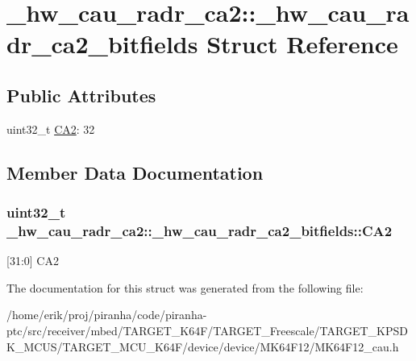 \hypertarget{struct__hw__cau__radr__ca2_1_1__hw__cau__radr__ca2__bitfields}{}\section{\+\_\+hw\+\_\+cau\+\_\+radr\+\_\+ca2\+:\+:\+\_\+hw\+\_\+cau\+\_\+radr\+\_\+ca2\+\_\+bitfields Struct Reference}
\label{struct__hw__cau__radr__ca2_1_1__hw__cau__radr__ca2__bitfields}
\subsection*{Public Attributes}
\begin{DoxyCompactItemize}
\item 
uint32\+\_\+t \hyperlink{struct__hw__cau__radr__ca2_1_1__hw__cau__radr__ca2__bitfields_a69694a3e5540507aba1a0eafe5e626ab}{C\+A2}\+: 32
\end{DoxyCompactItemize}


\subsection{Member Data Documentation}
\subsubsection[{\texorpdfstring{C\+A2}{CA2}}]{\setlength{\rightskip}{0pt plus 5cm}uint32\+\_\+t \+\_\+hw\+\_\+cau\+\_\+radr\+\_\+ca2\+::\+\_\+hw\+\_\+cau\+\_\+radr\+\_\+ca2\+\_\+bitfields\+::\+C\+A2}\hypertarget{struct__hw__cau__radr__ca2_1_1__hw__cau__radr__ca2__bitfields_a69694a3e5540507aba1a0eafe5e626ab}{}\label{struct__hw__cau__radr__ca2_1_1__hw__cau__radr__ca2__bitfields_a69694a3e5540507aba1a0eafe5e626ab}
\mbox{[}31\+:0\mbox{]} C\+A2 

The documentation for this struct was generated from the following file\+:\begin{DoxyCompactItemize}
\item 
/home/erik/proj/piranha/code/piranha-\/ptc/src/receiver/mbed/\+T\+A\+R\+G\+E\+T\+\_\+\+K64\+F/\+T\+A\+R\+G\+E\+T\+\_\+\+Freescale/\+T\+A\+R\+G\+E\+T\+\_\+\+K\+P\+S\+D\+K\+\_\+\+M\+C\+U\+S/\+T\+A\+R\+G\+E\+T\+\_\+\+M\+C\+U\+\_\+\+K64\+F/device/device/\+M\+K64\+F12/M\+K64\+F12\+\_\+cau.\+h\end{DoxyCompactItemize}
